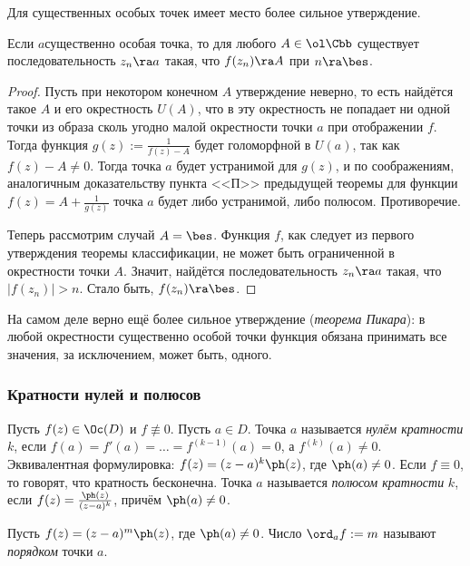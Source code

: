 \documentclass[a4paper]{article}
\begin{document}
Для существенных особых точек имеет место более сильное утверждение.

\begin{theorem}[Ю.\,В.\,Сохоцкого]
Если $a$\т существенно особая точка, то для любого $A\in \ol\Cbb$ существует последовательность
$z_n\ra a$ такая, что $f(z_n) \ra A$ при $n \ra \bes$.
\end{theorem}
\begin{proof}
Пусть при некотором конечном $A$ утверждение неверно, то есть найдётся такое $A$ и его окрестность $U(A)$, что
в эту окрестность не попадает ни одной точки из образа сколь угодно малой окрестности точки $a$ при отображении $f$.
Тогда функция $g(z) := \frac{1}{f(z)-A}$ будет голоморфной в $U(a)$, так как $f(z)-A \neq 0$. Тогда точка $a$ будет
устранимой для $g(z)$, и по соображениям, аналогичным доказательству пункта <<П>> предыдущей теоремы для функции
$f(z) = A + \frac{1}{g(z)}$ точка $a$ будет либо устранимой, либо полюсом. Противоречие.

Теперь рассмотрим случай $A = \bes$. Функция $f$, как следует из первого утверждения теоремы классификации,
не может быть ограниченной в окрестности точки $A$. Значит, найдётся последовательность $z_n\ra a$ такая,
что $|f(z_n)| > n$. Стало быть, $f(z_n)\ra\bes$.
\end{proof}

\begin{note}
На самом деле верно ещё более сильное утверждение (\emph{теорема Пикара}): в любой окрестности существенно
особой точки функция обязана принимать все значения, за исключением, может быть, одного.
\end{note}

\subsubsection{Кратности нулей и полюсов}

\begin{df}
Пусть $f(z)\in \Oc(D)$ и $f \not\equiv 0$. Пусть $a\in D$. Точка $a$ называется \emph{нулём кратности $k$},
если $f(a)=f'(a)= \ldots =f^{(k-1)}(a)=0$, а $f^{(k)}(a)\neq 0$.
Эквивалентная формулировка: $f(z)=(z-a)^k \ph(z)$, где $\ph(a)\ne 0$.
Если $f \equiv 0$, то говорят, что кратность бесконечна.
Точка $a$ называется \emph{полюсом кратности} $k$, если $f(z) = \frac{\ph(z)}{(z-a)^k}$, причём $\ph(a) \neq 0$.
\end{df}

\begin{df}
Пусть $f(z) = (z-a)^m\ph(z)$, где $\ph(a) \neq 0$. Число $\ord_a f := m$ называют \emph{порядком} точки $a$.
\end{df}
\end{document}
